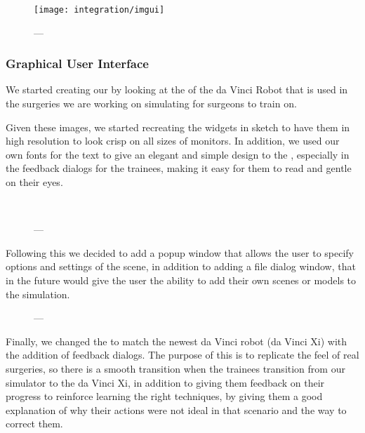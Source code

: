 \begin{figure}
  \centering%
  \texttt{[image: integration/imgui]}
  \caption{---}\label{fig:}
\end{figure}

\subsubsection{Graphical User Interface}\label{ssec:gui}
We started creating our  by looking at the  of the da Vinci Robot that is used in the surgeries we are working on simulating for surgeons to train on.

Given these images, we started recreating the widgets in sketch to have them in high resolution to look crisp on all sizes of monitors. In addition, we used our own fonts for the text to give an elegant and simple design to the , especially in the feedback dialogs for the trainees, making it easy for them to read and gentle on their eyes.

\begin{figure}
  \centering%
  \setlength{\fboxsep}{0pt}%
  \setlength{\fboxrule}{0.1pt}%
  \\[1ex]
  \caption{---}\label{fig:}
\end{figure}

Following this we decided to add a popup window that allows the user to specify options and settings of the scene, in addition to adding a file dialog window, that in the future would give the user the ability to add their own scenes or models to the simulation.

\begin{figure}
    \centering%
    \setlength{\fboxsep}{0pt}%
    \setlength{\fboxrule}{0.1pt}%
    \caption{---}
\end{figure}

Finally, we changed the  to match the newest da Vinci robot (da Vinci Xi) with the addition of feedback dialogs. The purpose of this is to replicate the feel of real surgeries, so there is a smooth transition when the trainees transition from our simulator to the da Vinci Xi, in addition to giving them feedback on their progress to reinforce learning the right techniques, by giving them a good explanation of why their actions were not ideal in that scenario and the way to correct them.

